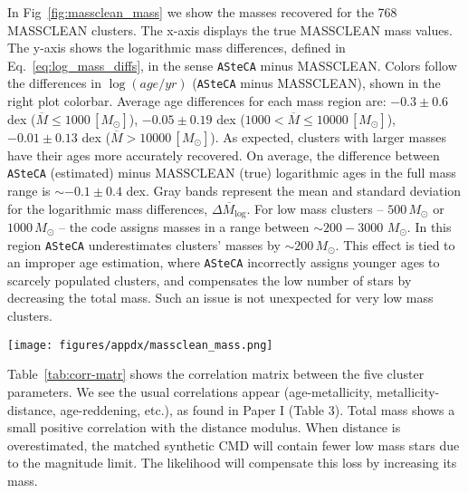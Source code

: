 \documentclass[referee]{aa}
\begin{document}
\begin{appendix}
In Fig~\ref{fig:massclean_mass} we show the masses recovered for the 768
MASSCLEAN clusters. The x-axis displays the true MASSCLEAN mass
values. The y-axis shows the logarithmic mass differences, defined in
Eq.~\ref{eq:log_mass_diffs}, in the sense \texttt{ASteCA} minus MASSCLEAN.\@
%
Colors follow the differences in $\log(age/yr)$ (\texttt{ASteCA} minus
MASSCLEAN), shown in the right plot colorbar.
Average age differences for each mass region are: 
$-0.3{\pm}0.6$ dex ($\overline{M}{\le}1000\,[M_{\odot}]$),
$-0.05{\pm}0.19$ dex ($1000{<}\overline{M}{\le}10000\,[M_{\odot}]$),
$-0.01{\pm}0.13$ dex ($\overline{M}{>}10000\,[M_{\odot}]$).
As expected, clusters with larger masses have their ages more accurately
recovered. On average, the difference between \texttt{ASteCA} (estimated) minus
MASSCLEAN (true) logarithmic ages in the full mass range is ${\sim}-0.1{\pm}0.4$
dex.
%
Gray bands represent the mean and standard deviation for the logarithmic
mass differences, $\overline{\Delta M_{\log}}$.
%
For low mass clusters -- $500\,M_{\odot}$ or $1000\,M_{\odot}$ -- the
code assigns masses in a range between ${\sim}200{-}3000$ $M_{\odot}$.
In this region \texttt{ASteCA} underestimates clusters' masses by
${\sim}200\,M_{\odot}$. This effect is tied to an improper age estimation, where
\texttt{ASteCA} incorrectly assigns younger ages to scarcely populated clusters,
and compensates the low number of stars by decreasing the total mass. Such an
issue is not unexpected for very low mass clusters.

\begin{figure*}
\texttt{[image: figures/appdx/massclean\_mass.png]}
\caption{Recovered masses by \texttt{ASteCA} for the 768 MASSCLEAN clusters.
Logarithmic mass differences $\Delta M_{\log}$ are obtained in the sense
\texttt{ASteCA} minus MASSCLEAN, and shown in the y-axis. MASSCLEAN masses in
the x-axis are perturbed with a small random scatter.}
\label{fig:massclean_mass}
\end{figure*}

Table~\ref{tab:corr-matr} shows the correlation matrix between the five cluster
parameters. We see the usual correlations appear (age-metallicity,
metallicity-distance, age-reddening, etc.), as found in Paper I (Table 3).
Total mass shows a small positive correlation with the distance modulus.
When distance is overestimated, the matched synthetic CMD will contain fewer low
mass stars due to the magnitude limit. The likelihood will compensate this loss
by increasing its mass.


\end{appendix}
\end{document}
